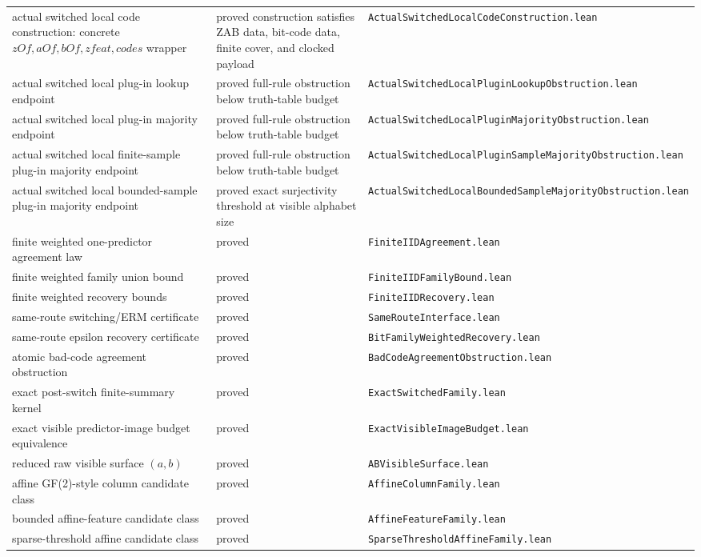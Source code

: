 \documentclass[11pt]{article}
\theoremstyle{remark}
\begin{document}
\begin{center}
\begin{tabular}{lll}
actual switched local code construction: concrete \(zOf,aOf,bOf,zfeat,codes\) wrapper & proved construction satisfies ZAB data, bit-code data, finite cover, and clocked payload & \texttt{ActualSwitchedLocalCodeConstruction.lean} \\
actual switched local plug-in lookup endpoint & proved full-rule obstruction below truth-table budget & \texttt{ActualSwitchedLocalPluginLookupObstruction.lean} \\
actual switched local plug-in majority endpoint & proved full-rule obstruction below truth-table budget & \texttt{ActualSwitchedLocalPluginMajorityObstruction.lean} \\
actual switched local finite-sample plug-in majority endpoint & proved full-rule obstruction below truth-table budget & \texttt{ActualSwitchedLocalPluginSampleMajorityObstruction.lean} \\
actual switched local bounded-sample plug-in majority endpoint & proved exact surjectivity threshold at visible alphabet size & \texttt{ActualSwitchedLocalBoundedSampleMajorityObstruction.lean} \\
finite weighted one-predictor agreement law & proved & \texttt{FiniteIIDAgreement.lean} \\
finite weighted family union bound & proved & \texttt{FiniteIIDFamilyBound.lean} \\
finite weighted recovery bounds & proved & \texttt{FiniteIIDRecovery.lean} \\
same-route switching/ERM certificate & proved & \texttt{SameRouteInterface.lean} \\
same-route epsilon recovery certificate & proved & \texttt{BitFamilyWeightedRecovery.lean} \\
atomic bad-code agreement obstruction & proved & \texttt{BadCodeAgreementObstruction.lean} \\
exact post-switch finite-summary kernel & proved & \texttt{ExactSwitchedFamily.lean} \\
exact visible predictor-image budget equivalence & proved & \texttt{ExactVisibleImageBudget.lean} \\
reduced raw visible surface $(a,b)$ & proved & \texttt{ABVisibleSurface.lean} \\
affine GF(2)-style column candidate class & proved & \texttt{AffineColumnFamily.lean} \\
bounded affine-feature candidate class & proved & \texttt{AffineFeatureFamily.lean} \\
sparse-threshold affine candidate class & proved & \texttt{SparseThresholdAffineFamily.lean} \\

\end{tabular}
\end{center}
\end{document}
